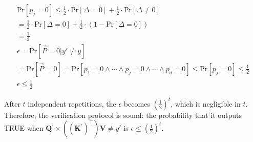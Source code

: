 \documentclass[11pt]{article}
\begin{document}
\begin{itemize}
    \[ \label{neqzero2}
    \begin{split}
        \text{Pr}[p_j=0] \leq \frac{1}{2} \cdot \text{Pr}[\Delta=0] + \frac{1}{2}\cdot \text{Pr}[\Delta\neq 0] \\
        = \frac{1}{2} \cdot \text{Pr}[\Delta=0] + \frac{1}
        {2}\cdot(1-\text{Pr}[\Delta=0])\\
        =\frac{1}{2} \\
        \epsilon=\text{Pr}[\vec{P}=0| y' \neq y] \\
        = \text{Pr}[\vec{P}=0]=\text{Pr}[p_1=0 \wedge \cdots \wedge p_j=0 \wedge \cdots \wedge p_d=0] \leq \text{Pr}[p_j=0] \leq \frac{1}{2}\\
        \epsilon \leq \frac{1}{2}
    \end{split}
    \]
\end{itemize}

After $t$ independent repetitions, the $\epsilon$ becomes $(\frac{1}{2})^t$, which is negligible in $t$. Therefore, the verification protocol is sound: the probability that it outputs TRUE when $\mathbf{Q}^{'} \times ((\mathbf{K}^{'})^\top)\mathbf{V} \neq y'$ is $\epsilon \leq (\frac{1}{2})^t$.


\end{document}
